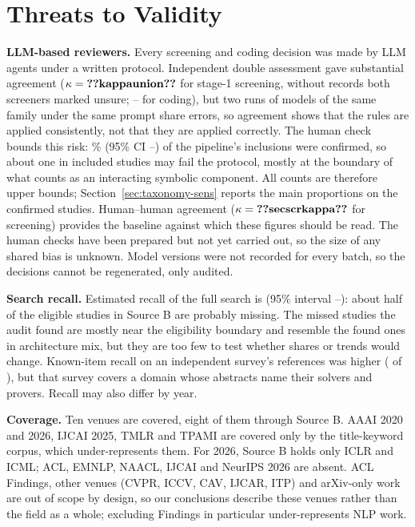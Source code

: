 \section{Threats to Validity}
\label{sec:validity}

\textbf{LLM-based reviewers.} Every screening and coding decision was made by LLM agents under a written protocol. Independent double assessment gave substantial agreement ($\kappa=\cnt{kappaunion}$ for stage-1 screening,  without records both screeners marked unsure; -- for coding), but two runs of models of the same family under the same prompt share errors, so agreement shows that the rules are applied consistently, not that they are applied correctly.
\ifhumancheck
The human check bounds this risk: \% (95\% CI --) of the pipeline's inclusions were confirmed, so about one in  included studies may fail the protocol, mostly at the boundary of what counts as an interacting symbolic component. All counts are therefore upper bounds; Section~\ref{sec:taxonomy-sens} reports the main proportions on the confirmed studies.
\ifsecondrater
Human--human agreement ($\kappa=\cnt{secscrkappa}$ for screening) provides the baseline against which these figures should be read.
\fi
\else
The human checks have been prepared but not yet carried out, so the size of any shared bias is unknown.
\fi
Model versions were not recorded for every batch, so the decisions cannot be regenerated, only audited.

\textbf{Search recall.} Estimated recall of the full search is  (95\% interval --): about half of the eligible studies in Source B are probably missing. The missed studies the audit found are mostly near the eligibility boundary and resemble the found ones in architecture mix, but they are too few to test whether shares or trends would change. Known-item recall on an independent survey's references was higher ( of ), but that survey covers a domain whose abstracts name their solvers and provers. Recall may also differ by year.

\textbf{Coverage.} Ten venues are covered, eight of them through Source B. AAAI 2020 and 2026, IJCAI 2025, TMLR and TPAMI are covered only by the title-keyword corpus, which under-represents them. For 2026, Source B holds only ICLR and ICML; ACL, EMNLP, NAACL, IJCAI and NeurIPS 2026 are absent. ACL Findings, other venues (CVPR, ICCV, CAV, IJCAR, ITP) and arXiv-only work are out of scope by design, so our conclusions describe these venues rather than the field as a whole; excluding Findings in particular under-represents NLP work.

